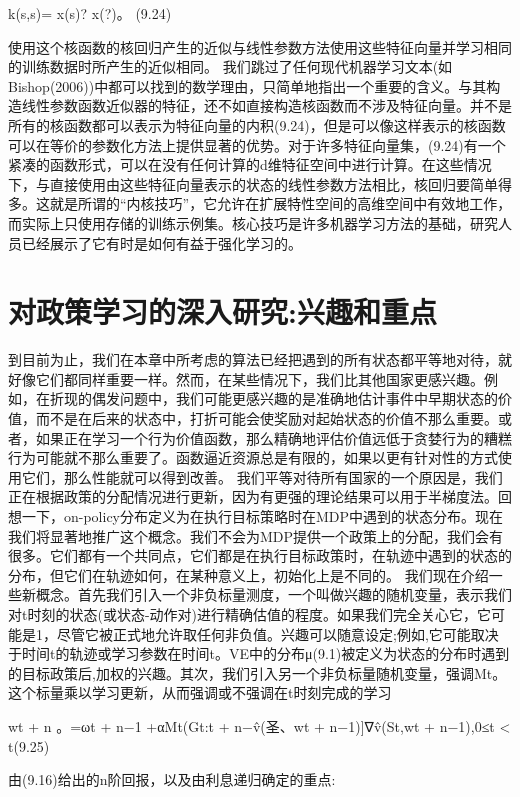 {k(s,s)= x(s)? x(?)。 					(9.24)

使用这个核函数的核回归产生的近似与线性参数方法使用这些特征向量并学习相同的训练数据时所产生的近似相同。
我们跳过了任何现代机器学习文本(如Bishop(2006))中都可以找到的数学理由，只简单地指出一个重要的含义。与其构造线性参数函数近似器的特征，还不如直接构造核函数而不涉及特征向量。并不是所有的核函数都可以表示为特征向量的内积(9.24)，但是可以像这样表示的核函数可以在等价的参数化方法上提供显著的优势。对于许多特征向量集，(9.24)有一个紧凑的函数形式，可以在没有任何计算的d维特征空间中进行计算。在这些情况下，与直接使用由这些特征向量表示的状态的线性参数方法相比，核回归要简单得多。这就是所谓的“内核技巧”，它允许在扩展特性空间的高维空间中有效地工作，而实际上只使用存储的训练示例集。核心技巧是许多机器学习方法的基础，研究人员已经展示了它有时是如何有益于强化学习的。

\section{对政策学习的深入研究:兴趣和重点}

到目前为止，我们在本章中所考虑的算法已经把遇到的所有状态都平等地对待，就好像它们都同样重要一样。然而，在某些情况下，我们比其他国家更感兴趣。例如，在折现的偶发问题中，我们可能更感兴趣的是准确地估计事件中早期状态的价值，而不是在后来的状态中，打折可能会使奖励对起始状态的价值不那么重要。或者，如果正在学习一个行为价值函数，那么精确地评估价值远低于贪婪行为的糟糕行为可能就不那么重要了。函数逼近资源总是有限的，如果以更有针对性的方式使用它们，那么性能就可以得到改善。
我们平等对待所有国家的一个原因是，我们正在根据政策的分配情况进行更新，因为有更强的理论结果可以用于半梯度法。回想一下，on-policy分布定义为在执行目标策略时在MDP中遇到的状态分布。现在我们将显著地推广这个概念。我们不会为MDP提供一个政策上的分配，我们会有很多。它们都有一个共同点，它们都是在执行目标政策时，在轨迹中遇到的状态的分布，但它们在轨迹如何，在某种意义上，初始化上是不同的。
我们现在介绍一些新概念。首先我们引入一个非负标量测度，一个叫做兴趣的随机变量，表示我们对t时刻的状态(或状态-动作对)进行精确估值的程度。如果我们完全关心它，它可能是1，尽管它被正式地允许取任何非负值。兴趣可以随意设定;例如,它可能取决于时间t的轨迹或学习参数在时间t。VE中的分布μ(9.1)被定义为状态的分布时遇到的目标政策后,加权的兴趣。其次，我们引入另一个非负标量随机变量，强调Mt。这个标量乘以学习更新，从而强调或不强调在t时刻完成的学习


wt + n
。=ωt + n−1 +αMt(Gt:t + n−v̂(圣、wt + n−1)]∇v̂(St,wt + n−1),0≤t < t(9.25)

由(9.16)给出的n阶回报，以及由利息递归确定的重点:

}
